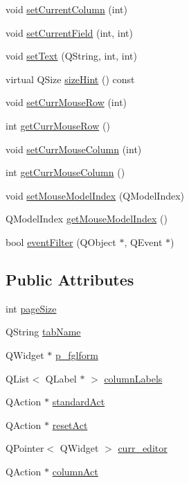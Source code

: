 \begin{DoxyCompactItemize}
void \hyperlink{classTableView_a51769748b8e61de5f2e118ff5df32887}{setCurrentColumn} (int)
\item 
void \hyperlink{classTableView_a245773b2b9426d4e354cf55fff770aa8}{setCurrentField} (int, int)
\item 
void \hyperlink{classTableView_abe0f2fa077f2d14e7e14f6cfcad09bd6}{setText} (QString, int, int)
\item 
virtual QSize \hyperlink{classTableView_a448f34f348c812c632d5e33b7f6987a0}{sizeHint} () const 
\item 
void \hyperlink{classTableView_ae672b410481126e82682273afd28ccdb}{setCurrMouseRow} (int)
\item 
int \hyperlink{classTableView_a4c4cd480a0979197e2b96e6b03fa0213}{getCurrMouseRow} ()
\item 
void \hyperlink{classTableView_ae927aad90eebbc37f4429ec40393a175}{setCurrMouseColumn} (int)
\item 
int \hyperlink{classTableView_af23a2d29fe926816fc8d42f11ea57a38}{getCurrMouseColumn} ()
\item 
void \hyperlink{classTableView_a54c133e2fe1893644c9996694c075ed2}{setMouseModelIndex} (QModelIndex)
\item 
QModelIndex \hyperlink{classTableView_ae777b72755652714896a7b45b96bb2da}{getMouseModelIndex} ()
\item 
bool \hyperlink{classTableView_a119f899686b60f0c3d0a910b65e2daa8}{eventFilter} (QObject $\ast$, QEvent $\ast$)
\end{DoxyCompactItemize}
\subsection*{Public Attributes}
\begin{DoxyCompactItemize}
\item 
int \hyperlink{classTableView_abb4a46ca1492e88b8fe2fa9b68595340}{pageSize}
\item 
QString \hyperlink{classTableView_aa26e19998b21b401d0f7b4c703a7c91d}{tabName}
\item 
QWidget $\ast$ \hyperlink{classTableView_a1d048152ea82f3f8d33e538cb032b37b}{p\_\-fglform}
\item 
QList$<$ QLabel $\ast$ $>$ \hyperlink{classTableView_a1160d50c2fd480dfd59b3d7660ef17b0}{columnLabels}
\item 
QAction $\ast$ \hyperlink{classTableView_a24e6725afbdbe0fded4ee3409fc877a7}{standardAct}
\item 
QAction $\ast$ \hyperlink{classTableView_a513618ab0a9e4a3048ab617b68ba4409}{resetAct}
\item 
QPointer$<$ QWidget $>$ \hyperlink{classTableView_a294454aaf1b1d44841f39bc28527d93c}{curr\_\-editor}
\item 
QAction $\ast$ \hyperlink{classTableView_a1808f7915f3db4bdea5fb535ecebda52}{columnAct}
\end{DoxyCompactItemize}
